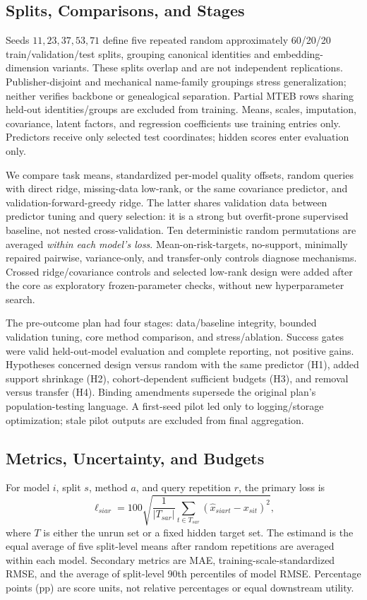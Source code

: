 \documentclass{article}
\begin{document}
\subsection{Splits, Comparisons, and Stages}
Seeds $11,23,37,53,71$ define five repeated random approximately 60/20/20 train/validation/test splits, grouping canonical identities and embedding-dimension variants. These splits overlap and are not independent replications. Publisher-disjoint and mechanical name-family groupings stress generalization; neither verifies backbone or genealogical separation. Partial MTEB rows sharing held-out identities/groups are excluded from training. Means, scales, imputation, covariance, latent factors, and regression coefficients use training entries only. Predictors receive only selected test coordinates; hidden scores enter evaluation only.

We compare task means, standardized per-model quality offsets, random queries with direct ridge, missing-data low-rank, or the same covariance predictor, and validation-forward-greedy ridge. The latter shares validation data between predictor tuning and query selection: it is a strong but overfit-prone supervised baseline, not nested cross-validation. Ten deterministic random permutations are averaged \emph{within each model's loss}. Mean-on-risk-targets, no-support, minimally repaired pairwise, variance-only, and transfer-only controls diagnose mechanisms. Crossed ridge/covariance controls and selected low-rank design were added after the core as exploratory frozen-parameter checks, without new hyperparameter search.

The pre-outcome plan had four stages: data/baseline integrity, bounded validation tuning, core method comparison, and stress/ablation. Success gates were valid held-out-model evaluation and complete reporting, not positive gains. Hypotheses concerned design versus random with the same predictor (H1), added support shrinkage (H2), cohort-dependent sufficient budgets (H3), and removal versus transfer (H4). Binding amendments supersede the original plan's population-testing language. A first-seed pilot led only to logging/storage optimization; stale pilot outputs are excluded from final aggregation.

\subsection{Metrics, Uncertainty, and Budgets}
For model $i$, split $s$, method $a$, and query repetition $r$, the primary loss is
\begin{equation}
\ell_{siar}=100\sqrt{\frac{1}{|T_{sar}|}\sum_{t\in T_{sar}}
(\hat x_{siart}-x_{sit})^2},
\label{eq:metric}
\end{equation}
where $T$ is either the unrun set or a fixed hidden target set. The estimand is the equal average of five split-level means after random repetitions are averaged within each model. Secondary metrics are MAE, training-scale-standardized RMSE, and the average of split-level 90th percentiles of model RMSE. Percentage points (pp) are score units, not relative percentages or equal downstream utility.
\end{document}
